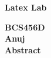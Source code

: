 \documentclass[25pt, a4paper]{article}
\begin{document}
\begin{center}
\Large 
\textbf{Latex Lab}\\
\vspace{0.5cm}

\large
\textbf{BCS456D}\\
\vspace{0.5cm}
\large
\textbf{Anuj}\\
\vspace{0.9cm}
\large
\textbf{Abstract}\\
\end{center}
\lipsum[1]
\end{document}
